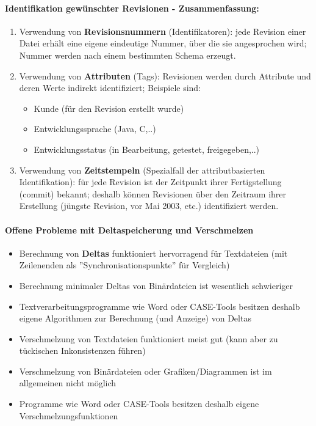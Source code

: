 \paragraph{Identifikation gewünschter Revisionen - Zusammenfassung:}
\begin{enumerate}
	\item Verwendung von \textbf{Revisionsnummern} (Identifikatoren): jede Revision einer Datei erhält eine eigene eindeutige Nummer, über die sie angesprochen wird; Nummer werden nach einem bestimmten Schema erzeugt.
	\item Verwendung von \textbf{Attributen} (Tags): Revisionen werden durch Attribute und deren Werte indirekt identifiziert; Beispiele sind:
	\begin{itemize}
		\item Kunde (für den Revision erstellt wurde)
		\item Entwicklungssprache (Java, C,..)
		\item Entwicklungsstatus (in Bearbeitung, getestet, freigegeben,..)
	\end{itemize}
	\item Verwendung von \textbf{Zeitstempeln} (Spezialfall der attributbasierten Identifikation): für jede Revision ist der Zeitpunkt ihrer Fertigstellung (commit) bekannt; deshalb können Revisionen über den Zeitraum ihrer Erstellung (jüngste Revision, vor Mai 2003, etc.) identifiziert werden.
\end{enumerate}
\paragraph{Offene Probleme mit Deltaspeicherung und Verschmelzen}
\begin{itemize}
	\item Berechnung von \textbf{Deltas} funktioniert hervorragend für Textdateien (mit Zeilenenden als ''Synchronisationspunkte'' für Vergleich)
	\item Berechnung minimaler Deltas von Binärdateien ist wesentlich schwieriger 
	\item Textverarbeitungsprogramme wie Word oder CASE-Tools besitzen deshalb eigene Algorithmen zur Berechnung (und Anzeige) von Deltas
	\item Verschmelzung von Textdateien funktioniert meist gut (kann aber zu tückischen Inkonsistenzen führen)
	\item Verschmelzung von Binärdateien oder Grafiken/Diagrammen ist im allgemeinen nicht möglich
	\item Programme wie Word oder CASE-Tools besitzen deshalb eigene Verschmelzungsfunktionen
\end{itemize}
